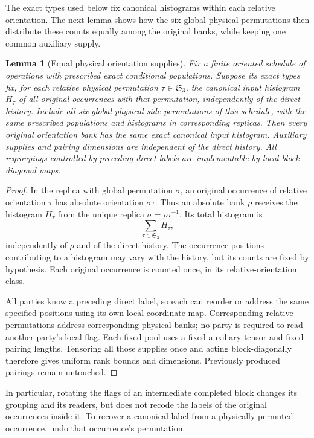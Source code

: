 \documentclass[11pt]{article}
\numberwithin{equation}{section}
\newtheorem{lemma}[theorem]{Lemma}
\theoremstyle{definition}
\theoremstyle{remark}
\begin{document}
The exact types used below fix canonical histograms within each relative
orientation.  The next lemma shows how the six global physical permutations
then distribute these counts equally among the original banks, while
keeping one common auxiliary supply.

\begin{lemma}[Equal physical orientation supplies]
\label{alg:orientation-banks}
Fix a finite oriented schedule of operations with prescribed exact
conditional populations.  Suppose its exact types fix, for each relative
physical permutation \(\tau\in\mathfrak S_3\), the canonical input
histogram \(H_\tau\) of all original occurrences with that permutation,
independently of the direct history.  Include all six global physical side
permutations of this schedule, with the same prescribed populations and
histograms in corresponding replicas.
Then every original orientation bank has the same exact canonical input
histogram.  Auxiliary supplies and pairing dimensions are independent of
the direct history.  All regroupings controlled by preceding direct labels
are implementable by local block-diagonal maps.
\end{lemma}
\begin{proof}
In the replica with global permutation \(\sigma\), an original occurrence
of relative orientation \(\tau\) has absolute orientation
\(\sigma\tau\).  Thus an absolute bank \(\rho\) receives the histogram
\(H_\tau\) from the unique replica
\(\sigma=\rho\tau^{-1}\).  Its total histogram is
\[
 \sum_{\tau\in\mathfrak S_3}H_\tau,
\]
independently of \(\rho\) and of the direct history.  The occurrence
positions contributing to a histogram may vary with the history, but its
counts are fixed by hypothesis.  Each original occurrence is counted once,
in its relative-orientation class.

All parties know a preceding direct label, so each can reorder or address
the same specified positions using its own local coordinate map.
Corresponding relative permutations address corresponding physical banks;
no party is required to read another party's local flag.  Each fixed pool
uses a fixed auxiliary tensor and fixed pairing lengths.  Tensoring all
those supplies once and acting block-diagonally therefore gives uniform
rank bounds and dimensions.  Previously produced pairings remain untouched.
\end{proof}

In particular, rotating the flags of an intermediate completed block
changes its grouping and its readers, but does not recode the labels of
the original occurrences inside it.  To recover a canonical label from a
physically permuted occurrence, undo that occurrence's permutation.
\end{document}
